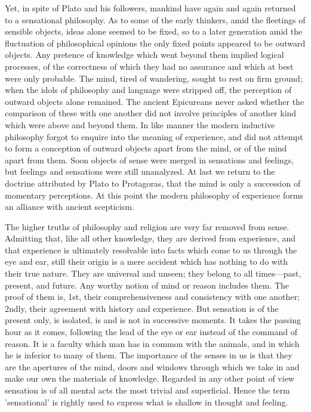 \documentclass[11pt,letter]{article}
\begin{document}
\par  Yet, in spite of Plato and his followers, mankind have again and again returned to a sensational philosophy. As to some of the early thinkers, amid the fleetings of sensible objects, ideas alone seemed to be fixed, so to a later generation amid the fluctuation of philosophical opinions the only fixed points appeared to be outward objects. Any pretence of knowledge which went beyond them implied logical processes, of the correctness of which they had no assurance and which at best were only probable. The mind, tired of wandering, sought to rest on firm ground; when the idols of philosophy and language were stripped off, the perception of outward objects alone remained. The ancient Epicureans never asked whether the comparison of these with one another did not involve principles of another kind which were above and beyond them. In like manner the modern inductive philosophy forgot to enquire into the meaning of experience, and did not attempt to form a conception of outward objects apart from the mind, or of the mind apart from them. Soon objects of sense were merged in sensations and feelings, but feelings and sensations were still unanalyzed. At last we return to the doctrine attributed by Plato to Protagoras, that the mind is only a succession of momentary perceptions. At this point the modern philosophy of experience forms an alliance with ancient scepticism.

\par  The higher truths of philosophy and religion are very far removed from sense. Admitting that, like all other knowledge, they are derived from experience, and that experience is ultimately resolvable into facts which come to us through the eye and ear, still their origin is a mere accident which has nothing to do with their true nature. They are universal and unseen; they belong to all times—past, present, and future. Any worthy notion of mind or reason includes them. The proof of them is, 1st, their comprehensiveness and consistency with one another; 2ndly, their agreement with history and experience. But sensation is of the present only, is isolated, is and is not in successive moments. It takes the passing hour as it comes, following the lead of the eye or ear instead of the command of reason. It is a faculty which man has in common with the animals, and in which he is inferior to many of them. The importance of the senses in us is that they are the apertures of the mind, doors and windows through which we take in and make our own the materials of knowledge. Regarded in any other point of view sensation is of all mental acts the most trivial and superficial. Hence the term 'sensational' is rightly used to express what is shallow in thought and feeling.
\end{document}
